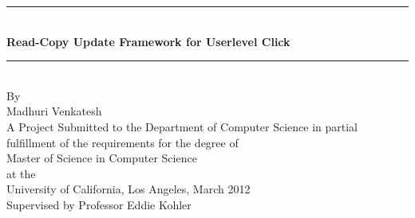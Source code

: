 \begin{titlepage}
\begin{center}
\newcommand{\HRule}{\rule{\linewidth}{0.5mm}}
\vspace*{1.5in}
\HRule \\[0.4cm]
{\huge \bfseries Read-Copy Update Framework for Userlevel Click}\\[0.4cm]
\HRule \\[0.4cm]
{\Large By}\\[0.4cm]
{\Large Madhuri Venkatesh}\\[1.0cm]
{\large A Project Submitted to the Department of Computer Science in partial
fulfillment of the requirements for the degree of}\\[1.0cm] 

{\Large Master of Science in Computer Science}\\[0.4cm]
{at the}\\[0.4cm]
{\Large University of California, Los Angeles, March 2012}\\[1.0cm]
{\Large Supervised by Professor Eddie Kohler}\\[1.0cm]
\vfill
\end{center}
\end{titlepage}
